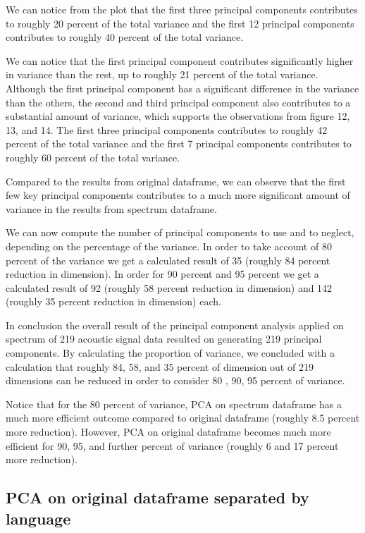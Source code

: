 We can notice from the plot that the first three principal components contributes to roughly 20 percent of the total variance and the first 12 principal components contributes to roughly 40 percent of the total variance.

We can notice that the first principal component contributes significantly higher in variance than the rest, up to roughly 21 percent of the total variance. Although the first principal component has a significant difference in the variance than the others, the second and third principal component also contributes to a substantial amount of variance, which supports the observations from figure 12, 13, and 14. The first three principal components contributes to roughly 42 percent of the total variance and the first 7 principal components contributes to roughly 60 percent of the total variance.

Compared to the results from original dataframe, we can observe that the first few key principal components contributes to a much more significant amount of variance in the results from spectrum dataframe.

We can now compute the number of principal components to use and to neglect, depending on the percentage of the variance. In order to take account of 80 percent of the variance we get a calculated result of 35 (roughly 84 percent reduction in dimension). In order for 90 percent and 95 percent we get a calculated result of 92 (roughly 58 percent reduction in dimension) and 142 (roughly 35 percent reduction in dimension) each. 

In conclusion the overall result of the principal component analysis applied on spectrum of 219 acoustic signal data resulted on generating 219 principal components. By calculating the proportion of variance, we concluded with a calculation that roughly 84, 58, and 35 percent of dimension out of 219 dimensions can be reduced in order to consider 80 , 90, 95 percent of variance. 

Notice that for the 80 percent of variance, PCA on spectrum dataframe has a much more efficient outcome compared to original dataframe (roughly 8.5 percent more reduction). However, PCA on original dataframe becomes much more efficient for 90, 95, and further percent of variance (roughly 6 and 17 percent more reduction).


\newpage
\subsection{PCA on original dataframe separated by language}


